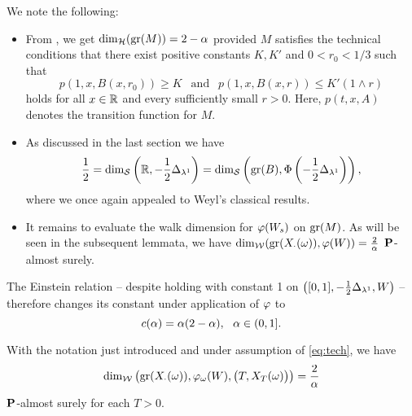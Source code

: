 We note the following:
\begin{itemize}
  \item From \cite{liu1998hausdorff}, we get $\dim_{\mathcal{H}}(\operatorname{gr}(M))=2-\alpha$ provided $M$ satisfies the technical conditions that there exist positive constants $K,K'$ and $0<r_0<1/3$ such that 
  \begin{equation}\label{eq:tech}
    p(1,x,B(x,r_0))\geq K\ \ \text{ and }\ \ 
    p(1,x,B(x,r))\leq K'(1\wedge r)
  \end{equation}
  holds for all $x\in\mathbb{R}$ and every sufficiently small $r>0$. Here, $p(t,x,A)$ denotes the transition function for $M$.
  \item As discussed in the last section we have
  \[
    \frac{1}{2}=\dim_{\mathcal{S}}\left(\mathbb{R},-\frac{1}{2}\Delta_{\lambda^1}\right)
    =\dim_{\mathcal{S}}\left(\operatorname{gr}(B),\Phi \left(-\frac{1}{2}\Delta_{\lambda^1}\right)\right),
  \]
  where we once again appealed to Weyl's classical results. 
  \item It remains to evaluate the walk dimension for $\varphi(W_s)$ on 
  $\operatorname{gr}(M)$. As will be seen in the subsequent lemmata, we have 
  $\dim_{\mathcal{W}}(\operatorname{gr}(X_\cdot(\omega)),\varphi(W))=\frac{2}{\alpha}$ $\mathbf{P}$-almost surely.
\end{itemize}
The Einstein relation -- despite holding with constant 1 on 
$\left([0,1],-\frac{1}{2}\Delta_{\lambda^1},W\right)$ -- therefore changes its constant under application of $\varphi$ to
\[
  c(\alpha)=\alpha(2-\alpha),\ \ \alpha\in(0,1].
\]
\begin{lem}
  With the notation just introduced and under assumption of \eqref{eq:tech}, we have 
  \begin{equation}\label{eq:BMdimw}
    \dim_{\mathcal{W}}\left(\operatorname{gr}(X_\cdot(\omega)),\varphi_\omega(W),\big(T,X_T(\omega)\big)\right)
    =\frac{2}{\alpha}
  \end{equation}
  $\mathbf{P}$-almost surely for each $T>0$.
\end{lem}
